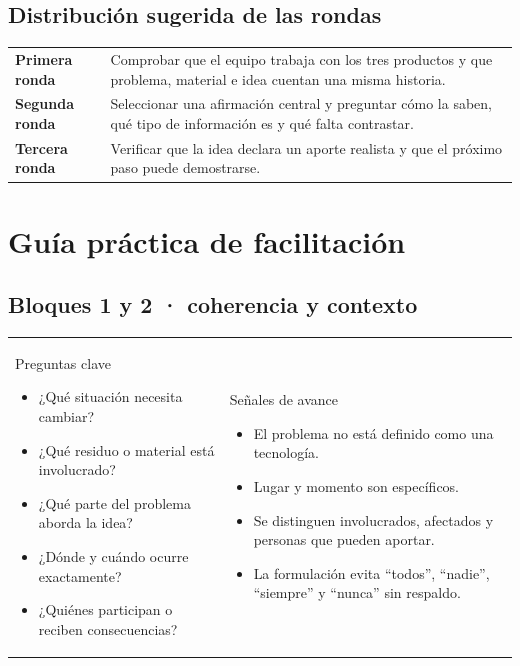 \documentclass[10pt,a4paper]{article}
\begin{document}
\subsection{Distribución sugerida de las rondas}
\begin{tabularx}{\textwidth}{@{}p{39mm}Y@{}}
\textbf{Primera ronda} & Comprobar que el equipo trabaja con los tres productos y que problema, material e idea cuentan una misma historia. \\
\textbf{Segunda ronda} & Seleccionar una afirmación central y preguntar cómo la saben, qué tipo de información es y qué falta contrastar. \\
\textbf{Tercera ronda} & Verificar que la idea declara un aporte realista y que el próximo paso puede demostrarse. \\
\end{tabularx}

\newpage
\section{Guía práctica de facilitación}

\subsection{Bloques 1 y 2 · coherencia y contexto}
\begin{tabularx}{\textwidth}{@{}Y@{\hspace{5mm}}Y@{}}
\begin{docbox}[height=66mm]{Preguntas clave}
\begin{itemize}
  \item ¿Qué situación necesita cambiar?
  \item ¿Qué residuo o material está involucrado?
  \item ¿Qué parte del problema aborda la idea?
  \item ¿Dónde y cuándo ocurre exactamente?
  \item ¿Quiénes participan o reciben consecuencias?
\end{itemize}
\end{docbox}
&
\begin{docbox}[height=66mm]{Señales de avance}
\begin{itemize}
  \item El problema no está definido como una tecnología.
  \item Lugar y momento son específicos.
  \item Se distinguen involucrados, afectados y personas que pueden aportar.
  \item La formulación evita ``todos'', ``nadie'', ``siempre'' y ``nunca'' sin respaldo.
\end{itemize}
\end{docbox}
\end{tabularx}
\end{document}
